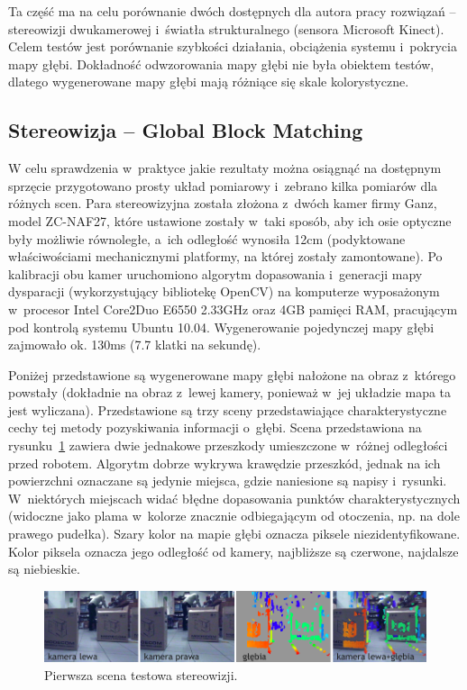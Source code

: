 Ta część ma na celu porównanie dwóch dostępnych dla autora pracy rozwiązań --
stereowizji dwukamerowej i~światła strukturalnego (sensora Microsoft Kinect).
Celem testów jest porównanie szybkości działania, obciążenia systemu i~pokrycia
mapy głębi. Dokładność odwzorowania mapy głębi nie była obiektem testów, dlatego
wygenerowane mapy głębi mają różniące się skale kolorystyczne.

\subsection{Stereowizja -- Global Block Matching}

W celu sprawdzenia w~praktyce jakie rezultaty można osiągnąć na dostępnym sprzęcie
przygotowano prosty układ pomiarowy i~zebrano kilka pomiarów dla różnych scen.
Para stereowizyjna została złożona z~dwóch kamer firmy Ganz, model ZC-NAF27, które
ustawione zostały w~taki sposób, aby ich osie optyczne były możliwie równoległe,
a~ich odległość wynosiła 12cm (podyktowane właściwościami mechanicznymi platformy,
na której zostały zamontowane). Po kalibracji obu kamer uruchomiono algorytm
dopasowania i~generacji mapy dysparacji (wykorzystujący bibliotekę OpenCV) na
komputerze wyposażonym w~procesor Intel Core2Duo E6550 2.33GHz oraz 4GB pamięci
RAM, pracującym pod kontrolą systemu Ubuntu 10.04. Wygenerowanie pojedynczej mapy
głębi zajmowało ok. 130ms (7.7 klatki na sekundę).

Poniżej przedstawione są wygenerowane mapy głębi nałożone na obraz z~którego powstały
(dokładnie na obraz z~lewej kamery, ponieważ w~jej układzie mapa ta jest wyliczana).
Przedstawione są trzy sceny przedstawiające charakterystyczne cechy tej metody
pozyskiwania informacji o~głębi. Scena przedstawiona na rysunku~\ref{fig:stereo_1}
zawiera dwie jednakowe przeszkody umieszczone w~różnej odległości przed robotem.
Algorytm dobrze wykrywa krawędzie przeszkód, jednak na ich powierzchni oznaczane
są jedynie miejsca, gdzie naniesione są napisy i~rysunki. W~niektórych miejscach
widać błędne dopasowania punktów charakterystycznych (widoczne jako plama w~kolorze
znacznie odbiegającym od otoczenia, np. na dole prawego pudełka). Szary kolor na
mapie głębi oznacza piksele niezidentyfikowane. Kolor piksela oznacza jego odległość
od kamery, najbliższe są czerwone, najdalsze są niebieskie.

\begin{figure}[h!]
\centering
\includegraphics{../../Common/img/stereo_1}
\caption[Pierwsza scena testowa stereowizji]{Pierwsza scena testowa stereowizji.}
\label{fig:stereo_1}
\end{figure}

